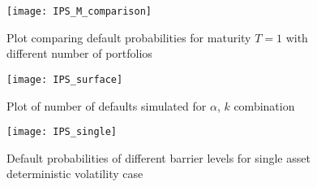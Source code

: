 \begin{figure}
	\centering
	\texttt{[image: IPS\_M\_comparison]}
	\caption{Plot comparing default probabilities for maturity $T=1$ with
	different number of portfolios}
	\label{fig:IPS_comparison}
\end{figure}

\begin{figure}
	\centering
	\texttt{[image: IPS\_surface]}
	\caption{Plot of number of defaults simulated for $\alpha$, $k$ combination}
	\label{fig:IPS_surface}
\end{figure}

\begin{figure}
	\centering
	\texttt{[image: IPS\_single]}
	\caption{Default probabilities of different barrier levels for single asset
	deterministic volatility case}
	\label{fig:IPS_single}
\end{figure}
